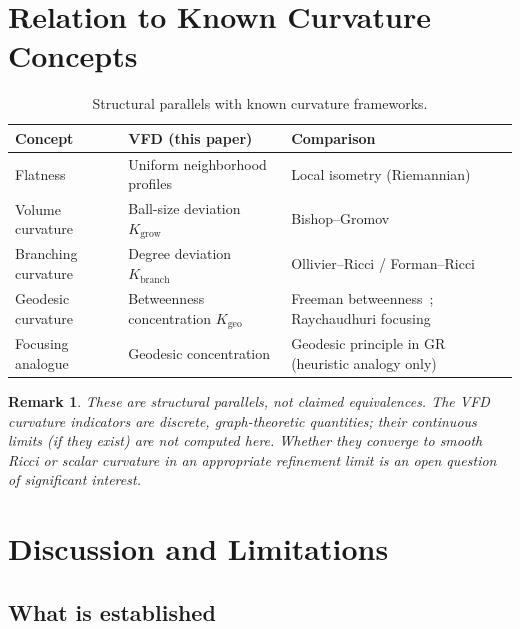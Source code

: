 \documentclass[12pt]{article}
\newtheorem{remark}[theorem]{Remark}
\begin{document}
\section{Relation to Known Curvature Concepts}\label{sec:known}

\begin{table}[ht]
\centering
\caption{Structural parallels with known curvature frameworks.}
\label{tab:known}
\begin{tabular}{@{}lll@{}}
\toprule
Concept & VFD (this paper) & Comparison \\
\midrule
Flatness & Uniform neighborhood profiles & Local isometry (Riemannian) \\
Volume curvature & Ball-size deviation $K_{\mathrm{grow}}$ & Bishop--Gromov~\citep{BishopCrittenden1964,Gromov1981} \\
Branching curvature & Degree deviation $K_{\mathrm{branch}}$ & Ollivier--Ricci / Forman--Ricci~\citep{Ollivier2009,Forman2003} \\
Geodesic curvature & Betweenness concentration $K_{\mathrm{geo}}$ & Freeman betweenness~\citep{Freeman1977}; Raychaudhuri focusing~\citep{Raychaudhuri1955} \\
Focusing analogue & Geodesic concentration & Geodesic principle in GR (heuristic analogy only) \\
\bottomrule
\end{tabular}
\end{table}

\begin{remark}
These are structural parallels, not claimed equivalences. The VFD curvature indicators are discrete, graph-theoretic quantities; their continuous limits (if they exist) are not computed here. Whether they converge to smooth Ricci or scalar curvature in an appropriate refinement limit is an open question of significant interest.
\end{remark}

\section{Discussion and Limitations}\label{sec:discussion}

\subsection{What is established}
\end{document}
